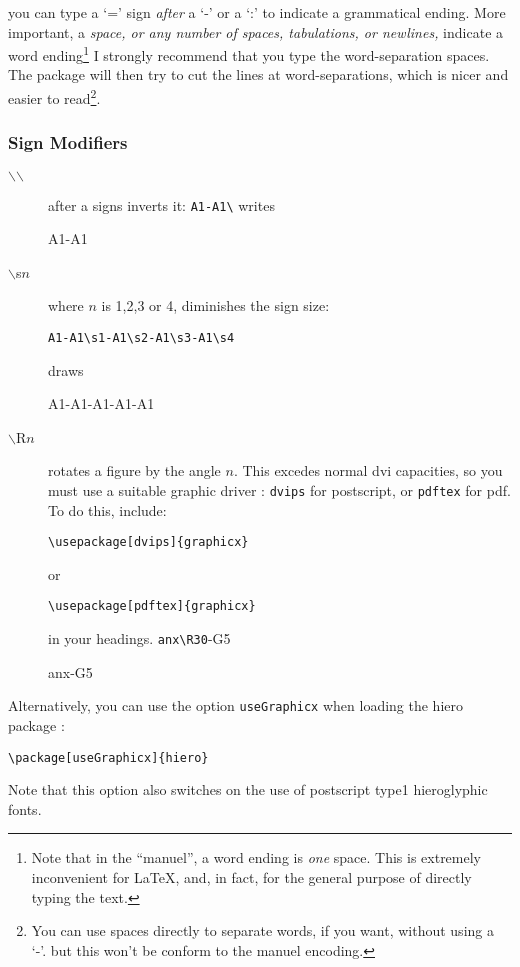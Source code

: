 \documentclass[final]{article}
\def\Backslash{$\backslash$}
\begin{document}
you can type a `=' sign {\em after\/}  a `-' or a `:' to indicate a
grammatical ending. More important, a {\em space, or any number of
  spaces, tabulations, or newlines,}  indicate a word
ending\footnote{Note that in the ``manuel'', a word ending is {\em
    one\/} space. This is extremely inconvenient for \LaTeX{}, and, in
  fact, for the general purpose of directly typing the text.}
I strongly recommend that you type the word-separation spaces. The
package will then try to cut the lines at word-separations, which is
nicer and easier to read\footnote{You can use spaces directly to
  separate words, if you want, without using a `-'. but this won't be
  conform to the manuel encoding.}.


\subsubsection{Sign Modifiers}

\begin{description}
\item[\Backslash{}\Backslash{}] after a signs inverts it:
  \verb|A1-A1\| writes 
  \begin{hieroglyph}
    A1-A1\
  \end{hieroglyph}

\item[\Backslash{}s$n$] where $n$ is 1,2,3 or 4, diminishes the 
  sign size: 
  \begin{center}
\verb/A1-A1\s1-A1\s2-A1\s3-A1\s4/ 
  \end{center}
draws
  \begin{hieroglyph}
    A1-A1-A1-A1-A1
  \end{hieroglyph}
  
\item[\Backslash{}R$n$] rotates a figure by the angle $n$. This
  excedes normal dvi capacities, so you must use a suitable graphic
  driver : \texttt{dvips}  for postscript, or \texttt{pdftex} for pdf.
To do this, include:
\begin{verbatim}
\usepackage[dvips]{graphicx}
\end{verbatim}
or 
\begin{verbatim}
\usepackage[pdftex]{graphicx}
\end{verbatim}
in your headings.
  \verb|anx|-G5
  \begin{hieroglyph}
    anx\R30-G5
  \end{hieroglyph}
\end{description}
Alternatively, you can use the option \verb|useGraphicx| when loading
the hiero package :
\begin{verbatim}
\package[useGraphicx]{hiero}
\end{verbatim}
Note that this option also switches on the use of postscript type1
hieroglyphic fonts.
\end{document}
